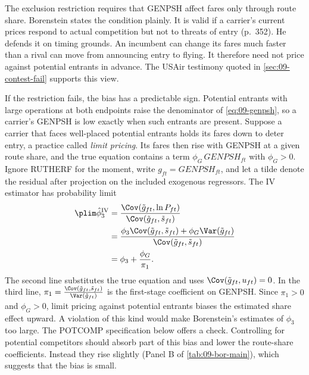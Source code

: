 The exclusion restriction requires that GENPSH affect fares only through route share. Borenstein states the
condition plainly. It is valid if a carrier's current prices respond to actual competition but not to threats
of entry (p.~352). He defends it on timing grounds. An incumbent can change its fares much faster than a rival
can move from announcing entry to flying. It therefore need not price against potential entrants in advance. The USAir testimony quoted in \cref{sec:09-contest-fail} supports this view.

If the restriction fails, the bias has a predictable sign. Potential entrants with large operations at both
endpoints raise the denominator of \cref{eq:09-genpsh}, so a carrier's GENPSH is low exactly when such entrants
are present. Suppose a carrier that faces well-placed potential entrants holds its fares down to deter entry, a
practice called \emph{limit pricing}. Its fares then rise with GENPSH at a given route share, and the true
equation contains a term $\phi_G\, \mathit{GENPSH}_{ft}$ with $\phi_G > 0$. Ignore RUTHERF for the moment, write $g_{ft} = \mathit{GENPSH}_{ft}$, and let a tilde denote the
residual after projection on the included exogenous regressors. The IV estimator has probability limit
\begin{align}
\plim \hat\phi_3^{\mathrm{IV}} &= \frac{\Cov(\tilde g_{ft}, \ln P_{ft})}{\Cov(\tilde g_{ft}, \tilde s_{ft})}
\notag \\
&= \frac{\phi_3 \Cov(\tilde g_{ft}, \tilde s_{ft}) + \phi_G \Var(\tilde g_{ft})}{\Cov(\tilde g_{ft}, \tilde s_{ft})}
\notag \\
&= \phi_3 + \frac{\phi_G}{\pi_1} . \label{eq:09-bor-ivbias}
\end{align}
The second line substitutes the true equation and uses $\Cov(\tilde g_{ft}, u_{ft}) = 0$. In the third line,
$\pi_1 = \frac{\Cov(\tilde g_{ft}, \tilde s_{ft})}{\Var(\tilde g_{ft})}$ is the first-stage coefficient on
GENPSH. Since $\pi_1 > 0$ and $\phi_G > 0$, limit pricing against potential entrants biases the estimated
share effect upward. A violation of this kind would make Borenstein's estimates of $\phi_3$ too large. The
POTCOMP specification below offers a check. Controlling for potential competitors should absorb part of this
bias and lower the route-share coefficients. Instead they rise slightly (Panel B of \cref{tab:09-bor-main}),
which suggests that the bias is small.

